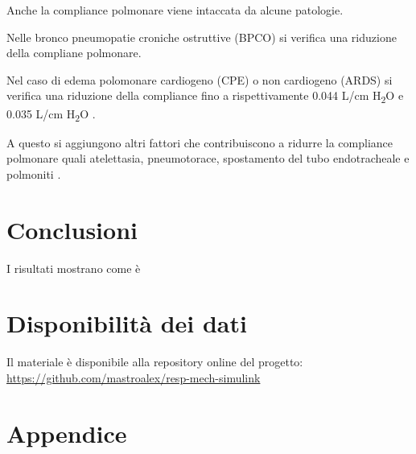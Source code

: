 Anche la compliance polmonare viene intaccata da alcune patologie.

Nelle bronco pneumopatie croniche ostruttive (BPCO) si verifica una riduzione della compliane polmonare.

Nel caso di edema polomonare cardiogeno (CPE) o non cardiogeno (ARDS) si verifica una riduzione della compliance fino a rispettivamente 0.044 L/cm H\textsubscript{2}O e 0.035 L/cm H\textsubscript{2}O \cite{milic-emili_basics_1999}.

A questo si aggiungono altri fattori che contribuiscono a ridurre la compliance polmonare quali atelettasia, pneumotorace, spostamento del tubo endotracheale e polmoniti \cite{grossbach_overview_2011}.

\section{Conclusioni}

I risultati mostrano come è 

\textcolor{blue}{
	\lipsum[1-2]
}
\section*{Disponibilità dei dati}

Il materiale è disponibile alla repository online del progetto: \url{https://github.com/mastroalex/resp-mech-simulink}


\raggedbottom

\pagebreak
\printbibliography[title=Riferimenti]


\clearpage
\onecolumn
\section*{Appendice}
